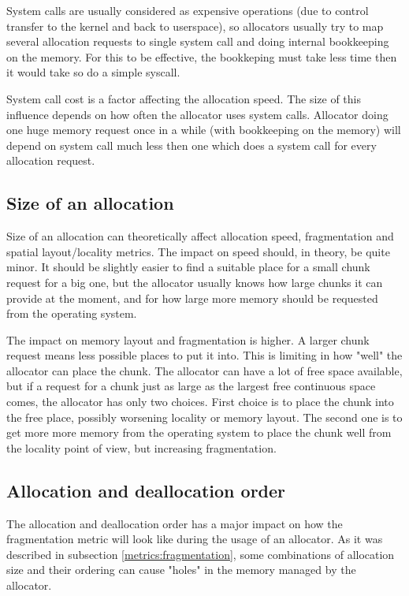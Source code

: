 System calls are usually considered as expensive operations (due to control transfer to the kernel and back to userspace), so allocators usually try to map several allocation requests to single system call and doing internal bookkeeping on the memory. For this to be effective, the bookkeping must take less time then it would take so do a simple syscall.

System call cost is a factor affecting the allocation speed. The size of this influence depends on how often the allocator uses system calls. Allocator doing one huge memory request once in a while (with bookkeeping on the memory) will depend on system call much less then one which does a system call for every allocation request.

\subsection{Size of an allocation}

Size of an allocation can theoretically affect allocation speed, fragmentation and spatial layout/locality metrics. The impact on speed should, in theory, be quite minor. It should be slightly easier to find a suitable place for a small chunk request for a big one, but the allocator usually knows how large chunks it can provide at the moment, and for how large more memory should be requested from the operating system.

The impact on memory layout and fragmentation is higher. A larger chunk request means less possible places to put it into. This is limiting in how "well" the allocator can place the chunk. The allocator can have a lot of free space available, but if a request for a chunk just as large as the largest free continuous space comes, the allocator has only two choices. First choice is to place the chunk into the free place, possibly worsening locality or memory layout. The second one is to get more more memory from the operating system to place the chunk well from the locality point of view, but increasing fragmentation.

\subsection{Allocation and deallocation order}

The allocation and deallocation order has a major impact on how the fragmentation metric will look like during the usage of an allocator. As it was described in subsection \ref{metrics:fragmentation}, some combinations of allocation size and their ordering can cause "holes" in the memory managed by the allocator.

